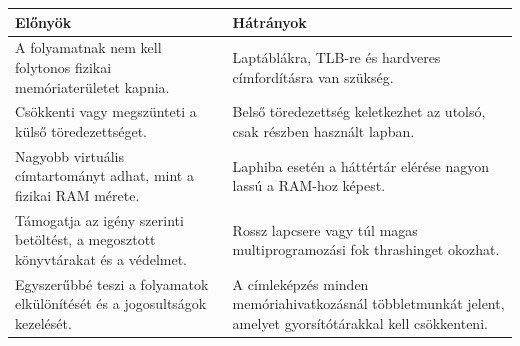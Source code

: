 \begin{tabularx}{\textwidth}{X X}
\toprule
\textbf{Előnyök} & \textbf{Hátrányok} \\
\midrule
A folyamatnak nem kell folytonos fizikai memóriaterületet kapnia. & Laptáblákra, TLB-re és hardveres címfordításra van szükség. \\
Csökkenti vagy megszünteti a külső töredezettséget. & Belső töredezettség keletkezhet az utolsó, csak részben használt lapban. \\
Nagyobb virtuális címtartományt adhat, mint a fizikai RAM mérete. & Laphiba esetén a háttértár elérése nagyon lassú a RAM-hoz képest. \\
Támogatja az igény szerinti betöltést, a megosztott könyvtárakat és a védelmet. & Rossz lapcsere vagy túl magas multiprogramozási fok thrashinget okozhat. \\
Egyszerűbbé teszi a folyamatok elkülönítését és a jogosultságok kezelését. & A címleképzés minden memóriahivatkozásnál többletmunkát jelent, amelyet gyorsítótárakkal kell csökkenteni. \\
\bottomrule
\end{tabularx}
